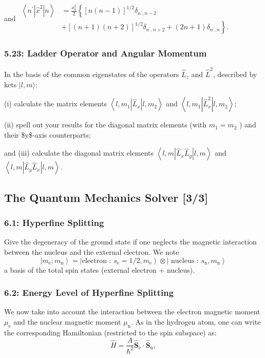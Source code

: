 \documentclass[11pt]{article}
\begin{document}
and \(\begin{aligned} \left\langle n^{\prime}|\hat{x}^{2}| n\right\rangle & =
\frac{x_0^2}{2}\left\{[n(n-1)]^{1 / 2} \delta_{n^{\prime}, n-2}\right. \\ &
\left.+[(n+1)(n+2)]^{1 / 2} \delta_{n^{\prime}, n+2}+(2 n+1) \delta_{n^{\prime}, n}\right\} .
\end{aligned}\)
\subsubsection{5.23: Ladder Operator and Angular Momentum}
\label{sec:orgcce9c72}
In the basis of the common eigenstates of the operators \(\hat{L}_z\) and
\(\hat{L}^2\), described by kets \(|l, m\rangle\):

(i) calculate the matrix elements \(\left\langle l, m_1\left|\hat{L}_x\right| l,
m_2\right\rangle\) and \(\left\langle l, m_1\left|\hat{L}_x^2\right| l, m_2\right\rangle\);

(ii) spell out your results for the diagonal matrix elements (with \(m_1=m_2\) )
and their \$y\$-axis counterparts;

and (iii) calculate the diagonal matrix elements \(\left\langle l, m\left|\hat{L}_x
\hat{L}_y\right| l, m\right\rangle\) and \(\left\langle l, m\left|\hat{L}_y \hat{L}_x\right|
l, m\right\rangle\).
\subsection{The Quantum Mechanics Solver [3/3]}
\label{sec:org88fbedb}
\subsubsection{6.1: Hyperfine Splitting}
\label{sec:orgb8245e7}
Give the degeneracy of the ground state if one neglects the magnetic interaction
between the nucleus and the external electron. We note $$
\left.\left.\left|m_{\mathrm{e}} ; m_{\mathrm{n}}\right\rangle=\mid \text {
electron : } s_{\mathrm{e}}=1 / 2, m_{\mathrm{e}}\right\rangle \otimes \mid
\text { nucleus : } s_{\mathrm{n}}, m_{\mathrm{n}}\right\rangle $$ a basis of
the total spin states (external electron + nucleus).
\subsubsection{6.2: Energy Level of Hyperfine Splitting}
\label{sec:org6de7bea}
We now take into account the interaction between the electron magnetic moment
\(\mu_{\mathrm{e}}\) and the nuclear magnetic moment \(\mu_{\mathrm{n}}\). As in the
hydrogen atom, one can write the corresponding Hamiltonian (restricted to the
spin subspace) as: $$ \hat{H}=\frac{A}{\hbar^2}
\hat{\boldsymbol{S}}_{\mathrm{e}} \cdot \hat{\boldsymbol{S}}_{\mathrm{n}}, $$
\end{document}
